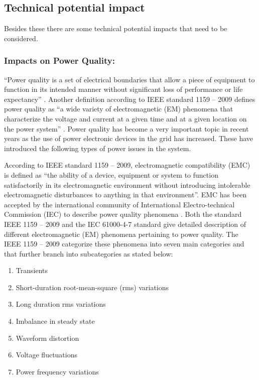 \subsection{Technical potential impact}
Besides these there are some technical potential impacts that need to be considered.

\subsubsection{Impacts on Power Quality:}
“Power quality is a set of electrical boundaries that allow a piece of equipment to function in its intended manner without significant loss of performance or life expectancy” \cite{TPI1}. Another definition according to IEEE standard 1159 – 2009 defines power quality as “a wide variety of electromagnetic (EM) phenomena that characterize the voltage and current at a given time and at a given location on the power system” \cite{TPI2}.  Power quality has become a very important topic in recent years as the use of power electronic devices in the grid has increased. These have introduced the following types of power issues in the system.

According to IEEE standard 1159 – 2009, electromagnetic compatibility (EMC) is defined as “the ability of a device, equipment or system to function satisfactorily in its electromagnetic environment without introducing intolerable electromagnetic disturbances to anything in that environment”.  EMC has been accepted by the international community of International Electro-technical Commission (IEC) to describe power quality phenomena \cite{TPI2}. Both the standard IEEE 1159 – 2009 and the IEC 61000-4-7 standard give detailed description of different electromagnetic (EM) phenomena pertaining to power quality. The IEEE 1159 – 2009 categorize these phenomena into seven main categories and that further branch into subcategories as stated below:
\begin{enumerate}
    \item Transients
    \item Short-duration root-mean-square (rms) variations
    \item Long duration rms variations
    \item Imbalance in steady state
    \item Waveform distortion
    \item Voltage fluctuations 
    \item Power frequency variations
\end{enumerate}

